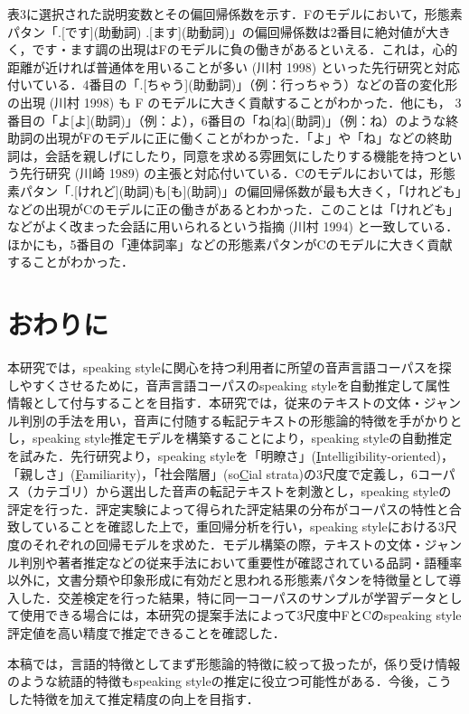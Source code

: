 \documentclass[japanese]{jnlp_1.4}
\begin{document}
表3に選択された説明変数とその偏回帰係数を示す．Fのモデルにおいて，形態素パタン「.[です](助動詞) \textbar .[ます](助動詞)」の偏回帰係数は2番目に絶対値が大きく，です・ます調の出現はFのモデルに負の働きがあるといえる．これは，心的距離が近ければ普通体を用いることが多い (川村 1998) といった先行研究と対応付いている．4番目の「.[ちゃう](助動詞)」（例：行っちゃう）などの音の変化形の出現 (川村 1998) も F のモデルに大きく貢献することがわかった．他にも， 3番目の「よ[よ](助詞)」（例：よ），6番目の「ね[ね](助詞)」（例：ね）のような終助詞の出現がFのモデルに正に働くことがわかった．「よ」や「ね」などの終助詞は，会話を親しげにしたり，同意を求める雰囲気にしたりする機能を持つという先行研究 (川崎 1989) の主張と対応付いている．Cのモデルにおいては，形態素パタン「.[けれど](助詞)も[も](助詞)」の偏回帰係数が最も大きく，「けれども」などの出現がCのモデルに正の働きがあるとわかった．このことは「けれども」などがよく改まった会話に用いられるという指摘 (川村 1994) と一致している．ほかにも，5番目の「連体詞率」などの形態素パタンがCのモデルに大きく貢献することがわかった．


\section{おわりに}

本研究では，speaking styleに関心を持つ利用者に所望の音声言語コーパスを探しやすくさせるために，音声言語コーパスのspeaking styleを自動推定して属性情報として付与することを目指す．本研究では，従来のテキストの文体・ジャンル判別の手法を用い，音声に付随する転記テキストの形態論的特徴を手がかりとし，speaking style推定モデルを構築することにより，speaking styleの自動推定を試みた．先行研究より，speaking styleを「明瞭さ」(\underline {I}ntelligibility-oriented)，「親しさ」(\underline {F}amiliarity)，「社会階層」(so\underline {C}ial strata)の3尺度で定義し，6コーパス（カテゴリ）から選出した音声の転記テキストを刺激とし，speaking styleの評定を行った．評定実験によって得られた評定結果の分布がコーパスの特性と合致していることを確認した上で，重回帰分析を行い，speaking styleにおける3尺度のそれぞれの回帰モデルを求めた．モデル構築の際，テキストの文体・ジャンル判別や著者推定などの従来手法において重要性が確認されている品詞・語種率以外に，文書分類や印象形成に有効だと思われる形態素パタンを特徴量として導入した．交差検定を行った結果，特に同一コーパスのサンプルが学習データとして使用できる場合には，本研究の提案手法によって3尺度中FとCのspeaking style評定値を高い精度で推定できることを確認した．

本稿では，言語的特徴としてまず形態論的特徴に絞って扱ったが，係り受け情報のような統語的特徴もspeaking styleの推定に役立つ可能性がある．今後，こうした特徴を加えて推定精度の向上を目指す．
\end{document}
